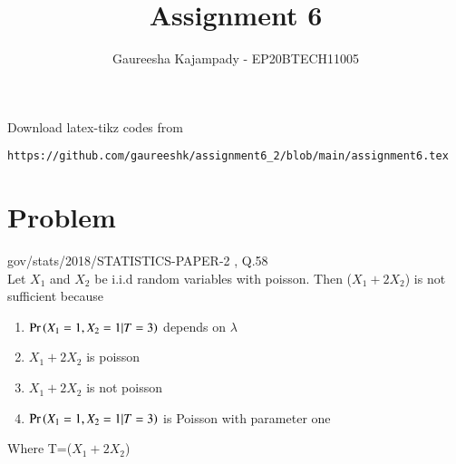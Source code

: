 \documentclass[journal,12pt,twocolumn]{IEEEtran}
\begin{document}
\def\putbox#1#2#3{\makebox[0in][l]{\makebox[#1][l]{}\raisebox{\baselineskip}[0in][0in]{\raisebox{#2}[0in][0in]{#3}}}}
     \def\rightbox#1{\makebox[0in][r]{#1}}  
     \def\centbox#1{\makebox[0in]{#1}}
     \def\topbox#1{\raisebox{-\baselineskip}[0in][0in]{#1}}
     \def\midbox#1{\raisebox{-0.5\baselineskip}[0in][0in]{#1}}
\vspace{3cm}
\title{Assignment 6}
\author{Gaureesha Kajampady - EP20BTECH11005}
\maketitle  
\newpage
\bigskips
\renewcommand{\thefigure}{\theenumi}
\renewcommand{\thetable}{\theenumi}
Download latex-tikz codes from 
%
\begin{lstlisting}
https://github.com/gaureeshk/assignment6_2/blob/main/assignment6.tex
\end{lstlisting}
\section{Problem}
gov/stats/2018/STATISTICS-PAPER-2 , Q.58\\
Let $X_{1}$ and  $X_{2}$ be i.i.d random variables with poisson. Then ($X_{1}+2X_{2}$) is not sufficient because
\begin{enumerate}
    \item{$\Pr\left(X_{1}=1,X_{2}=1 |T=3\right)$ depends on $\lambda$}\\
    \item{$X_{1}+2X_{2}$ is poisson}\\
     \item{$X_{1}+2X_{2}$ is not poisson}\\
      \item{$\Pr\left(X_{1}=1,X_{2}=1 | T=3\right)$ is Poisson with parameter one}\\
\end{enumerate}
Where T=($X_{1}+2X_{2}$)
\end{document}
